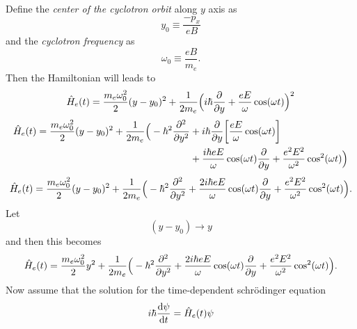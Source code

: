 \documentclass[a4paper]{article}
\numberwithin{equation}{subsection}
\numberwithin{equation}{section}
\begin{document}
Define the \textit{center of the cyclotron orbit} along $y$ axis as
\begin{equation} \label{1.11}
  y_0 \equiv \frac{-p_x}{eB}
\end{equation}
and the \textit{cyclotron frequency} as
\begin{equation} \label{1.12}
  \omega_0 \equiv \frac{eB}{m_e}.
\end{equation}
Then the Hamiltonian will leads to
\begin{equation} \label{1.13}
    \hat{H}_e(t) =
      \frac{m_e \omega_0^2}{2}(y-y_0)^2 +
      \frac{1}{2m_e}\Big(i\hbar \pdv{y}+\frac{eE}{\omega}\cos(\omega t)\Big)^2
\end{equation}
\begin{equation} \label{1.14}
  \begin{aligned}
    \hat{H}_e(t) =
      \frac{m_e \omega_0^2}{2}(y-y_0)^2 +
      \frac{1}{2m_e}\Big(
      -\hbar^2 \pdv[2]{y} & +
      i\hbar \pdv{y}\bigg[\frac{eE}{\omega}\cos(\omega t) \bigg] \\ & +
      \frac{i\hbar eE}{\omega}\cos(\omega t) \pdv{y}+
      \frac{e^2E^2}{\omega^2}\cos[2](\omega t)
      \Big)
  \end{aligned}
\end{equation}
\begin{equation} \label{1.15}
  \begin{aligned}
    \hat{H}_e(t) =
      \frac{m_e \omega_0^2}{2}(y-y_0)^2 +
      \frac{1}{2m_e}\Big(
      -\hbar^2 \pdv[2]{y} +
      \frac{2i\hbar eE}{\omega}\cos(\omega t) \pdv{y}+
      \frac{e^2E^2}{\omega^2}\cos[2](\omega t)
      \Big).
  \end{aligned}
\end{equation}
Let
\begin{equation} \label{1.16}
    (y - y_0) \rightarrow y
\end{equation}
and then this becomes
\begin{equation} \label{1.17}
  \begin{aligned}
    \hat{H}_e(t) =
      \frac{m_e \omega_0^2}{2}y^2 +
      \frac{1}{2m_e}\Big(
      -\hbar^2 \pdv[2]{y} +
      \frac{2i\hbar eE}{\omega}\cos(\omega t) \pdv{y}+
      \frac{e^2E^2}{\omega^2}\cos[2](\omega t)
      \Big).
  \end{aligned}
\end{equation}
Now assume that the solution for the time-dependent schrödinger equation
\begin{equation} \label{1.18}
    i \hbar \dv{\psi}{t} = \hat{H}_e(t)\psi
\end{equation}
\end{document}
